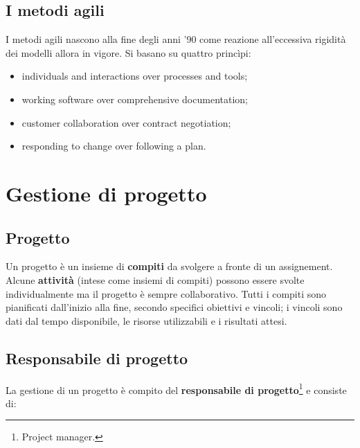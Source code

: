 \documentclass[a4paper]{article}
\begin{document}
		
	\subsection{I metodi agili}

		
I metodi agili nascono alla fine degli anni '90 come reazione all'eccessiva rigidità dei modelli allora in vigore. Si basano su quattro princìpi:
		
	\begin{itemize}
		
			
	\item individuals and interactions over processes and tools;
			
	\item working software over comprehensive documentation;
			
	\item customer collaboration over contract negotiation;
			
	\item responding to change over following a plan.
		
	\end{itemize}

	


		
	\section{Gestione di progetto}


		
	\subsection{Progetto}

		
Un progetto è un insieme di \textbf{compiti} da svolgere a fronte di un assignement. Alcune \textbf{attività} (intese come insiemi di compiti) possono essere svolte individualmente ma il progetto è sempre collaborativo. Tutti i compiti sono pianificati dall'inizio alla fine, secondo specifici obiettivi e vincoli; i vincoli sono dati dal tempo disponibile, le risorse utilizzabili e i risultati attesi.

		
	\subsection{Responsabile di progetto}

		
La gestione di un progetto è compito del \textbf{responsabile di progetto}\footnote{Project manager.} e consiste di:
		
\end{document}
